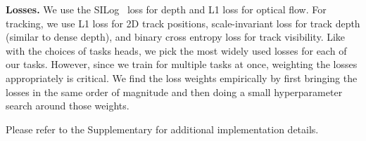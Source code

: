 \noindent\textbf{Losses.}
We use the SILog~\cite{eigen2014depth} loss for depth and L1 loss for optical flow. 
For tracking, we use L1 loss for 2D track positions, scale-invariant loss for track depth (similar to dense depth), and binary cross entropy loss for track visibility.
Like with the choices of tasks heads, we pick the most widely used losses for each of our tasks.
However, since we train for multiple tasks at once, weighting the losses appropriately is critical.
We find the loss weights empirically by first bringing the losses in the same order of magnitude and then doing a small hyperparameter search around those weights.

Please refer to the Supplementary for additional implementation details.
